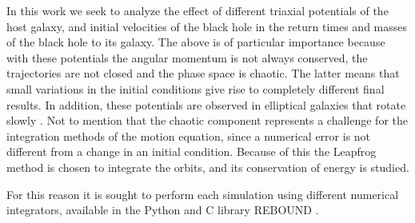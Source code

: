 	In this work we seek to analyze the effect of different triaxial potentials of the host galaxy, and initial velocities of the black hole in the return times and masses of the black hole to its galaxy. The above is of particular importance because with these potentials the angular momentum is not always conserved, the trajectories are not closed and the phase space is chaotic. The latter means that small variations in the initial conditions give rise to completely different final results. In addition, these potentials are observed in elliptical galaxies that rotate slowly \cite{buote2002chandra, binney1978elliptical}. Not to mention that the chaotic component represents a challenge for the integration methods of the motion equation, since a numerical error is not different from a change in an initial condition. Because of this the Leapfrog method is chosen to integrate the orbits, and its conservation of energy is studied.
	
	For this reason it is sought to perform each simulation using different numerical integrators, available in the Python and C library REBOUND \cite{larson2017modeling}.